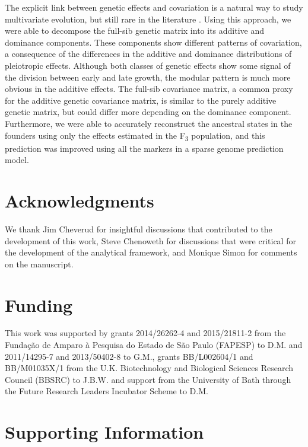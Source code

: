 \begin{refsection}
\enlargethispage{\baselineskip}
The explicit link between genetic effects and covariation is a natural way to
study multivariate evolution, but still rare in the literature
\parencite{Kelly2009-bj}. Using this approach, we were able to decompose the
full-sib genetic matrix into its additive and dominance components. These
components show different patterns of covariation, a consequence of the
differences in the additive and dominance distributions of pleiotropic
effects. Although both classes of genetic effects show some signal of the
division between early and late growth, the modular pattern is much more
obvious in the additive effects. The full-sib covariance matrix, a common
proxy for the additive genetic covariance matrix, is similar to the purely
additive genetic matrix, but could differ more depending on the dominance
component. Furthermore, we were able to accurately reconstruct the ancestral
states in the founders using only the effects estimated in the
F\textsubscript{3} population, and this prediction was improved using all the
markers in a sparse genome prediction model.


\section{Acknowledgments}

We thank Jim Cheverud for insightful discussions that contributed to the
development of this work, Steve Chenoweth for discussions that were critical
for the development of the analytical framework, and Monique Simon for
comments on the manuscript.


\section{Funding}

This work was supported by grants 2014/26262-4 and 2015/21811-2 from the
Fundação de Amparo à Pesquisa do Estado de São Paulo (FAPESP) to D.M.
and 2011/14295-7 and 2013/50402-8 to G.M., grants BB/L002604/1 and
BB/M01035X/1 from the U.K. Biotechnology and Biological Sciences
Research Council (BBSRC) to J.B.W. and support from the University of
Bath through the Future Research Leaders Incubator Scheme to D.M.

\printbibliography

\newpage

\section*{Supporting Information}


\end{refsection}
